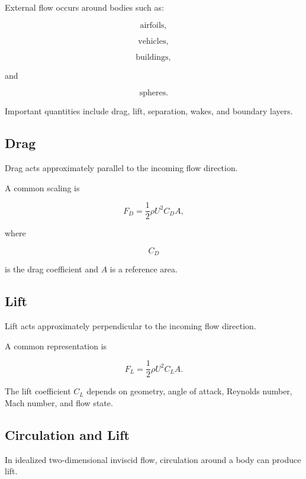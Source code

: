 External flow occurs around bodies such as:

\[
\boxed{
\text{airfoils},
}
\]

\[
\boxed{
\text{vehicles},
}
\]

\[
\boxed{
\text{buildings},
}
\]

and

\[
\boxed{
\text{spheres}.
}
\]

Important quantities include drag, lift, separation, wakes, and boundary
layers.

\subsection{Drag}
\label{subsec:fluid-drag}

Drag acts approximately parallel to the incoming flow direction.

A common scaling is

\[
\boxed{
F_D
=
\frac12
\rho U^2
C_DA,
}
\]

where

\[
C_D
\]

is the drag coefficient and \(A\) is a reference area.

\subsection{Lift}
\label{subsec:fluid-lift}

Lift acts approximately perpendicular to the incoming flow direction.

A common representation is

\[
\boxed{
F_L
=
\frac12
\rho U^2
C_LA.
}
\]

The lift coefficient \(C_L\) depends on geometry, angle of attack, Reynolds
number, Mach number, and flow state.

\subsection{Circulation and Lift}
\label{subsec:circulation-and-lift}

In idealized two-dimensional inviscid flow, circulation around a body can
produce lift.

